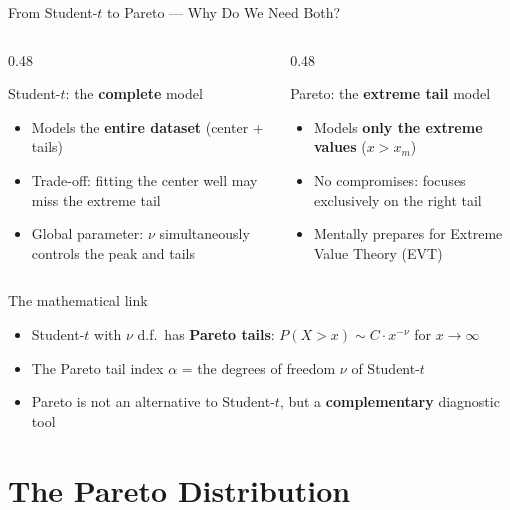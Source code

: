 \documentclass[9pt, aspectratio=169, t]{beamer}
\theoremstyle{definition}
\begin{document}
\begin{frame}{From Student-$t$ to Pareto --- Why Do We Need Both?}
\begin{columns}[T]
\begin{column}{0.48\textwidth}
\begin{block}{Student-$t$: the \textbf{complete} model}
\begin{itemize}\setlength\itemsep{2pt}
\item Models the \textbf{entire dataset} (center + tails)
\item Trade-off: fitting the center well may miss the extreme tail
\item Global parameter: $\nu$ simultaneously controls the peak and tails
\end{itemize}
\end{block}
\end{column}
\begin{column}{0.48\textwidth}
\begin{block}{Pareto: the \textbf{extreme tail} model}
\begin{itemize}\setlength\itemsep{2pt}
\item Models \textbf{only the extreme values} ($x > x_m$)
\item No compromises: focuses exclusively on the right tail
\item Mentally prepares for Extreme Value Theory (EVT)
\end{itemize}
\end{block}
\end{column}
\end{columns}
\vspace{0.2cm}
\begin{alertblock}{The mathematical link}
\begin{itemize}\setlength\itemsep{2pt}
\item Student-$t$ with $\nu$ d.f.\ has \textbf{Pareto tails}: $P(X > x) \sim C \cdot x^{-\nu}$ for $x \to \infty$
\item The Pareto tail index $\alpha$ = the degrees of freedom $\nu$ of Student-$t$
\item Pareto is not an alternative to Student-$t$, but a \textbf{complementary} diagnostic tool
\end{itemize}
\end{alertblock}
\end{frame}

\section{The Pareto Distribution}
\end{document}
